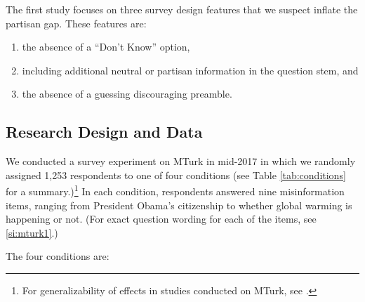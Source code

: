 \documentclass[12pt, letterpaper]{article}
\begin{document}
The first study focuses on three survey design features that we suspect inflate the partisan gap. These features are: 

\begin{enumerate}
    \item the absence of a ``Don't Know'' option,
    \item including additional neutral or partisan information in the question stem, and
    \item the absence of a guessing discouraging preamble.
\end{enumerate}

\subsection*{Research Design and Data}\label{subsec:data1}

We conducted a survey experiment on MTurk in mid-2017 in which we randomly assigned 1,253 respondents to one of four conditions (see Table \ref{tab:conditions} for a summary.)\footnote{For generalizability of effects in studies conducted on MTurk, see \citep{mullinix2015generalizability, coppock2018generalizability}.} In each condition, respondents answered nine misinformation items, ranging from President Obama's citizenship to whether global warming is happening or not. (For exact question wording for each of the items, see \cref{si:mturk1}.)

The four conditions are:
\end{document}
